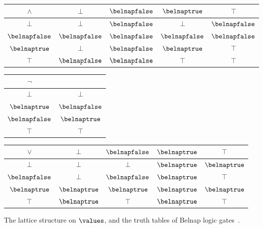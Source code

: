 \documentclass[10pt]{article}
\begin{document}
\begin{figure}[p]
    \centering
    \qquad
    \begin{tabular}{|c|cccc|}
        \hline
        \(\land\)        & \(\bot\)         & \(\belnapfalse\) & \(\belnaptrue\)  & \(\top\)         \\
        \hline
        \(\bot\)         & \(\bot\)         & \(\belnapfalse\) & \(\bot\)         & \(\belnapfalse\) \\
        \(\belnapfalse\) & \(\belnapfalse\) & \(\belnapfalse\) & \(\belnapfalse\) & \(\belnapfalse\) \\
        \(\belnaptrue\)  & \(\bot\)         & \(\belnapfalse\) & \(\belnaptrue\)  & \(\top\)         \\
        \(\top\)         & \(\belnapfalse\) & \(\belnapfalse\) & \(\top\)         & \(\top\)         \\
        \hline
    \end{tabular}
    \quad
    \begin{tabular}{|c|c|}
        \hline
        \(\neg\)         &                  \\
        \hline
        \(\bot\)         & \(\bot\)         \\
        \(\belnaptrue\)  & \(\belnapfalse\) \\
        \(\belnapfalse\) & \(\belnaptrue\)  \\
        \(\top\)         & \(\top\)         \\
        \hline
    \end{tabular}
    \quad
    \begin{tabular}{|c|cccc|}
        \hline
        \(\lor\)         & \(\bot\)        & \(\belnapfalse\) & \(\belnaptrue\) & \(\top\)        \\
        \hline
        \(\bot\)         & \(\bot\)        & \(\bot\)         & \(\belnaptrue\) & \(\belnaptrue\) \\
        \(\belnapfalse\) & \(\bot\)        & \(\belnapfalse\) & \(\belnaptrue\) & \(\top\)        \\
        \(\belnaptrue\)  & \(\belnaptrue\) & \(\belnaptrue\)  & \(\belnaptrue\) & \(\belnaptrue\) \\
        \(\top\)         & \(\belnaptrue\) & \(\top\)         & \(\belnaptrue\) & \(\top\)        \\
        \hline
    \end{tabular}

    \caption{The lattice structure on \(\values\), and the truth tables
        of Belnap logic gates~\cite{belnap1977useful}.}
    \label{fig:belnap}
\end{figure}
\end{document}
